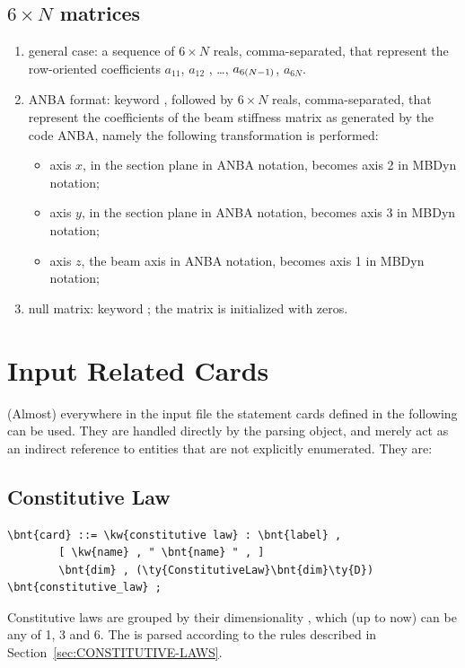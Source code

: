 \subsection{$6 \times N$ matrices}
\begin{enumerate}
    \item general case: a sequence of $6 \times N$ reals, comma-separated, that
    represent the row-oriented coefficients $ a_{11} $, $ a_{12}$ ,
    \ldots, $ a_{6\left( N-1 \right)} $, $ a_{6N} $.
    \item ANBA format: keyword , followed by $6 \times N$ reals,
    comma-separated, that represent the coefficients of the beam stiffness
    matrix as generated by the code ANBA, namely the following
    transformation is performed:
    \begin{itemize}
        \item axis $ x $, in the section plane in ANBA notation, 
	becomes axis 2 in MBDyn notation;    
	\item axis $ y $, in the section plane in ANBA notation, 
	becomes axis 3 in MBDyn notation;    
	\item axis $ z $, the beam axis in ANBA notation, 
	becomes axis 1 in MBDyn notation;    
    \end{itemize}
    \item null matrix: keyword ; the matrix is initialized 
    with zeros.
\end{enumerate}


\section{Input Related Cards} 
(Almost) everywhere in the input file the statement cards defined 
in the following can be used.
They are handled directly by the parsing object, and merely act as
an indirect reference to entities that are not explicitly enumerated.
They are:



\subsection{Constitutive Law}\label{sec:CONSTITUTIVE-LAW}
\begin{Verbatim}[commandchars=\\\{\}]
    \bnt{card} ::= \kw{constitutive law} : \bnt{label} ,
        [ \kw{name} , " \bnt{name} " , ]
        \bnt{dim} , (\ty{ConstitutiveLaw}\bnt{dim}\ty{D}) \bnt{constitutive_law} ;
\end{Verbatim}
Constitutive laws are grouped by their dimensionality ,
which (up to now) can be any of 1, 3 and 6.
The  is parsed according to the rules
described in Section~\ref{sec:CONSTITUTIVE-LAWS}.



